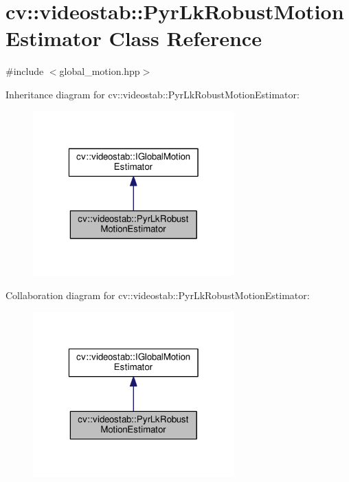 \hypertarget{classcv_1_1videostab_1_1PyrLkRobustMotionEstimator}{\section{cv\-:\-:videostab\-:\-:Pyr\-Lk\-Robust\-Motion\-Estimator Class Reference}
\label{classcv_1_1videostab_1_1PyrLkRobustMotionEstimator}
}


{\ttfamily \#include $<$global\-\_\-motion.\-hpp$>$}



Inheritance diagram for cv\-:\-:videostab\-:\-:Pyr\-Lk\-Robust\-Motion\-Estimator\-:\nopagebreak
\begin{figure}[H]
\begin{center}
\leavevmode
\includegraphics[width=220pt]{classcv_1_1videostab_1_1PyrLkRobustMotionEstimator__inherit__graph}
\end{center}
\end{figure}


Collaboration diagram for cv\-:\-:videostab\-:\-:Pyr\-Lk\-Robust\-Motion\-Estimator\-:\nopagebreak
\begin{figure}[H]
\begin{center}
\leavevmode
\includegraphics[width=220pt]{classcv_1_1videostab_1_1PyrLkRobustMotionEstimator__coll__graph}
\end{center}
\end{figure}
